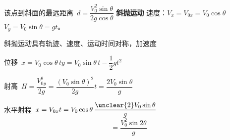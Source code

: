 该点到斜面的最远距离\ $d=\dfrac{V_0^2\sin\theta}{2g\cos\theta}$ %
\textbf{斜抛运动}
速度：$V_x=V_{0x}=V_0\cos\theta$\qquad $V_y=V_0\sin\theta=gt$。 %

斜抛运动具有轨迹、速度、运动时间对称，加速度

位移\ $x=V_0\cos\theta\,t$\qquad $y=V_0\sin\theta\,t-\dfrac12gt^2$

射高\ $H=\dfrac{V_{0y}^2}{2g}=\dfrac{(V_0\sin\theta)^2}{2g}$\qquad $t=\dfrac{2V_0\sin\theta}{g}$

水平射程\ $x=V_{0x}t=V_0\cos\theta\,\dfrac{\unclear{2}V_0\sin\theta}{g}$ %
\[
=\frac{V_0^2\sin2\theta}{g}
\]
